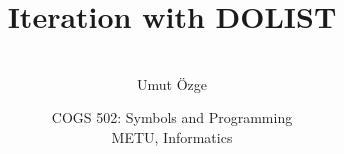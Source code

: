 \documentclass[ignorenonframetext,10pt,aspectratio=169]{beamer}
\title{Iteration with DOLIST}
\author{\  \\ \vspace{20pt} Umut \"Ozge\\  }
\date{COGS 502: Symbols and Programming \\ METU, Informatics}
\begin{document}
\begin{frame}\frametitle{}
\thispagestyle{empty}
\maketitle
\end{frame}

\begin{frame}[t,plain]{}

\end{frame}


\begin{frame}[t,plain]{}


\end{frame}

\begin{frame}[t,plain]{}


\end{frame}

\begin{frame}[t,plain]{}


\end{frame}

\begin{frame}[t,plain]{}


\end{frame}
\end{document}
